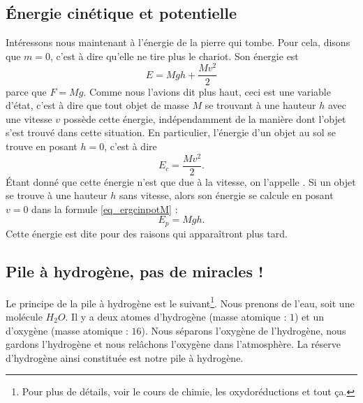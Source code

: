 \subsection{Énergie cinétique et potentielle}

Intéressons nous maintenant à l'énergie de la pierre qui tombe. Pour cela, disons que $m=0$, c'est à dire qu'elle ne tire plus le chariot. Son énergie est
\begin{equation}  \label{eq_ergcinpotM}
  E=Mgh+\frac{ Mv^2 }{ 2 }
\end{equation}
parce que $F=Mg$. Comme nous l'avions dit plus haut, ceci est une variable d'état, c'est à dire que tout objet de masse $M$ se trouvant à une hauteur $h$ avec une vitesse $v$ possède cette énergie, indépendamment de la manière dont l'objet s'est trouvé dans cette situation. En particulier, l'énergie d'un objet au sol se trouve en posant $h=0$, c'est à dire
\begin{equation}
  E_c=\frac{ Mv^2 }{ 2 }.
\end{equation}
Étant donné que cette énergie n'est que due à la vitesse, on l'appelle . Si un objet se trouve à une hauteur $h$ sans vitesse, alors son énergie se calcule en posant $v=0$ dans la formule \eqref{eq_ergcinpotM} :
\begin{equation}
  E_p=Mgh.
\end{equation}
Cette énergie est dite  pour des raisons qui apparaîtront plus tard. 

\subsection{Pile à hydrogène, pas de miracles !}

Le principe de la pile à hydrogène est le suivant\footnote{Pour plus de détails, voir le cours de chimie, les oxydoréductions et tout ça.}. Nous prenons de l'eau, soit une molécule $H_2O$. Il y a deux atomes d'hydrogène (masse atomique : $1$) et un d'oxygène (masse atomique : $16$). Nous séparons l'oxygène de l'hydrogène, nous gardons l'hydrogène et nous relâchons l'oxygène dans l'atmosphère. La réserve d'hydrogène ainsi constituée est notre pile à hydrogène.

